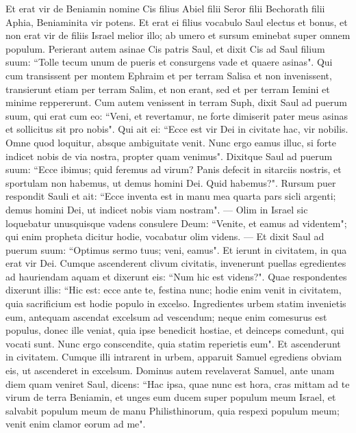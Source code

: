 \begin{biblechapter}  
\verse Et erat vir de Beniamin nomine Cis filius Abiel filii Seror filii Bechorath filii Aphia, Beniaminita vir potens. 
\verse Et erat ei filius vocabulo Saul electus et bonus, et non erat vir de filiis Israel melior illo; ab umero et sursum eminebat super omnem populum. 
\verse Perierant autem asinae Cis patris Saul, et dixit Cis ad Saul filium suum: “Tolle tecum unum de pueris et consurgens vade et quaere asinas". Qui cum transissent per montem Ephraim 
\verse et per terram Salisa et non invenissent, transierunt etiam per terram Salim, et non erant, sed et per terram Iemini et minime reppererunt. 
\verse Cum autem venissent in terram Suph, dixit Saul ad puerum suum, qui erat cum eo: “Veni, et revertamur, ne forte dimiserit pater meus asinas et sollicitus sit pro nobis". 
\verse Qui ait ei: “Ecce est vir Dei in civitate hac, vir nobilis. Omne quod loquitur, absque ambiguitate venit. Nunc ergo eamus illuc, si forte indicet nobis de via nostra, propter quam venimus". 
\verse Dixitque Saul ad puerum suum: “Ecce ibimus; quid feremus ad virum? Panis defecit in sitarciis nostris, et sportulam non habemus, ut demus homini Dei. Quid habemus?". 
\verse Rursum puer respondit Sauli et ait: “Ecce inventa est in manu mea quarta pars sicli argenti; demus homini Dei, ut indicet nobis viam nostram". — 
\verse Olim in Israel sic loquebatur unusquisque vadens consulere Deum: “Venite, et eamus ad videntem"; qui enim propheta dicitur hodie, vocabatur olim videns. — 
\verse Et dixit Saul ad puerum suum: “Optimus sermo tuus; veni, eamus". Et ierunt in civitatem, in qua erat vir Dei. 
\verse Cumque ascenderent clivum civitatis, invenerunt puellas egredientes ad hauriendam aquam et dixerunt eis: “Num hic est videns?". 
\verse Quae respondentes dixerunt illis: “Hic est: ecce ante te, festina nunc; hodie enim venit in civitatem, quia sacrificium est hodie populo in excelso. 
\verse Ingredientes urbem statim invenietis eum, antequam ascendat excelsum ad vescendum; neque enim comesurus est populus, donec ille veniat, quia ipse benedicit hostiae, et deinceps comedunt, qui vocati sunt. Nunc ergo conscendite, quia statim reperietis eum". 
\verse Et ascenderunt in civitatem. Cumque illi intrarent in urbem, apparuit Samuel egrediens obviam eis, ut ascenderet in excelsum. 
\verse Dominus autem revelaverat Samuel, ante unam diem quam veniret Saul, dicens: 
\verse “Hac ipsa, quae nunc est hora, cras mittam ad te virum de terra Beniamin, et unges eum ducem super populum meum Israel, et salvabit populum meum de manu Philisthinorum, quia respexi populum meum; venit enim clamor eorum ad me". 

\end{biblechapter}
